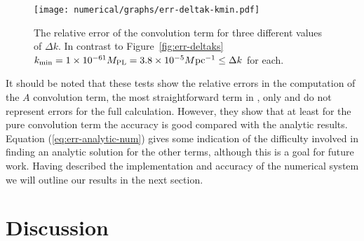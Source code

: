 \begin{figure}
 \centering
 \texttt{[image: numerical/graphs/err-deltak-kmin.pdf]}
 \caption[Relative error of the convolution term with fixed $\kmin$]{The 
relative error of the convolution term for three different values of $\Delta k$. In
contrast to Figure~\ref{fig:err-deltaks} $k_{\mathrm{min}}=1\times 10^{-61}M_{\mathrm{PL}}=3.8\times 10^{-5}M \mathrm{pc}^{-1} \le \Delta k$ for
each.}
 \label{fig:err-deltak-kmin}
\end{figure}


It should be noted that these tests show the relative errors in the
computation of the $A$ convolution term, the most straightforward term in , only and
do not
represent
errors for the full calculation. However, they show that at least for
the pure convolution term the accuracy is good compared with the
analytic results. Equation (\ref{eq:err-analytic-num}) gives some indication of
the difficulty involved in finding an analytic solution for the other
terms, although this is a goal for future work. Having described the
implementation and accuracy of the numerical system we will outline
our results in the next section.
 
% 
% 
% 

\section{Discussion}
\label{sec:disc-numerical}
